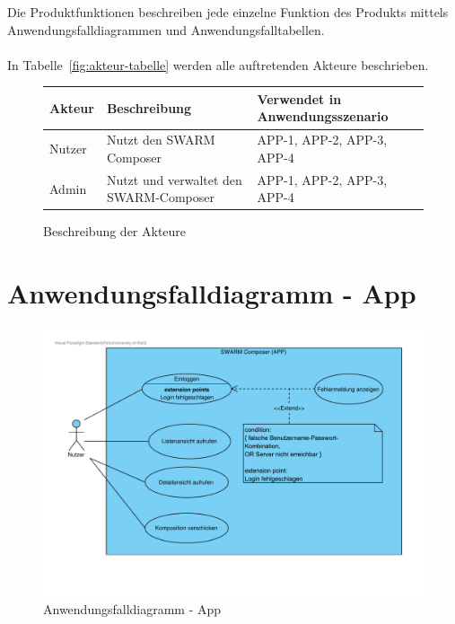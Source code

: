 Die Produktfunktionen beschreiben jede einzelne Funktion des Produkts mittels Anwendungsfalldiagrammen und Anwendungsfalltabellen.
\\\\
In  Tabelle~\autoref{fig:akteur-tabelle} werden alle auftretenden Akteure beschrieben.


\begin{figure}[h]
	\centering
	
	\begin{tabularx}{\textwidth}{ p{} | p{} | X }
		\textbf{Akteur} & \textbf{Beschreibung} & \textbf{Verwendet in Anwendungsszenario} \\ \hline
		Nutzer & Nutzt den SWARM Composer & APP-1, APP-2, APP-3, APP-4
		\\ \hline Admin & Nutzt und verwaltet den SWARM-Composer & APP-1, APP-2, APP-3, APP-4
	\end{tabularx}
	
	\caption{Beschreibung der Akteure}
	\label{fig:akteur-tabelle}
\end{figure}


\newpage

\section{Anwendungsfalldiagramm - App}

\begin{figure}[h]
	\centering	
	\includegraphics[width=\textwidth]{img/Produktfunktionen_app}	
	\caption{Anwendungsfalldiagramm - App}
	\label{fig:anwendungsfalldiagramm-app}
\end{figure}

